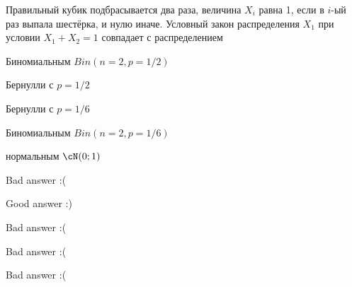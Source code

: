
\begin{question}
Правильный кубик подбрасывается два раза, величина \(X_i\) равна 1, если
в \(i\)-ый раз выпала шестёрка, и нулю иначе. Условный закон
распределения \(X_1\) при условии \(X_1+X_2=1\) совпадает с
распределением
\begin{answerlist}
  \item Биномиальным \(Bin(n=2, p=1/2)\)
  \item Бернулли с \(p=1/2\)
  \item Бернулли с \(p=1/6\)
  \item Биномиальным \(Bin(n=2, p=1/6)\)
  \item нормальным \(\cN(0;1)\)
\end{answerlist}
\end{question}

\begin{solution}
\begin{answerlist}
  \item Bad answer :(
  \item Good answer :)
  \item Bad answer :(
  \item Bad answer :(
  \item Bad answer :(
\end{answerlist}
\end{solution}

